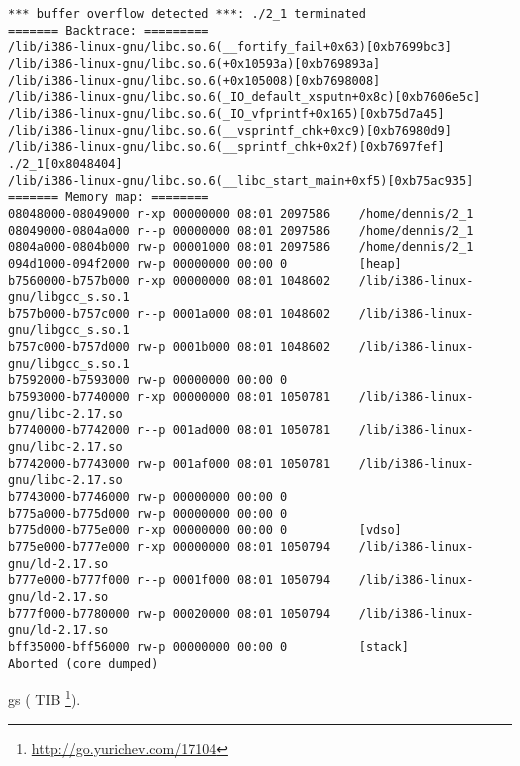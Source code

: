 \begin{lstlisting}
*** buffer overflow detected ***: ./2_1 terminated
======= Backtrace: =========
/lib/i386-linux-gnu/libc.so.6(__fortify_fail+0x63)[0xb7699bc3]
/lib/i386-linux-gnu/libc.so.6(+0x10593a)[0xb769893a]
/lib/i386-linux-gnu/libc.so.6(+0x105008)[0xb7698008]
/lib/i386-linux-gnu/libc.so.6(_IO_default_xsputn+0x8c)[0xb7606e5c]
/lib/i386-linux-gnu/libc.so.6(_IO_vfprintf+0x165)[0xb75d7a45]
/lib/i386-linux-gnu/libc.so.6(__vsprintf_chk+0xc9)[0xb76980d9]
/lib/i386-linux-gnu/libc.so.6(__sprintf_chk+0x2f)[0xb7697fef]
./2_1[0x8048404]
/lib/i386-linux-gnu/libc.so.6(__libc_start_main+0xf5)[0xb75ac935]
======= Memory map: ========
08048000-08049000 r-xp 00000000 08:01 2097586    /home/dennis/2_1
08049000-0804a000 r--p 00000000 08:01 2097586    /home/dennis/2_1
0804a000-0804b000 rw-p 00001000 08:01 2097586    /home/dennis/2_1
094d1000-094f2000 rw-p 00000000 00:00 0          [heap]
b7560000-b757b000 r-xp 00000000 08:01 1048602    /lib/i386-linux-gnu/libgcc_s.so.1
b757b000-b757c000 r--p 0001a000 08:01 1048602    /lib/i386-linux-gnu/libgcc_s.so.1
b757c000-b757d000 rw-p 0001b000 08:01 1048602    /lib/i386-linux-gnu/libgcc_s.so.1
b7592000-b7593000 rw-p 00000000 00:00 0
b7593000-b7740000 r-xp 00000000 08:01 1050781    /lib/i386-linux-gnu/libc-2.17.so
b7740000-b7742000 r--p 001ad000 08:01 1050781    /lib/i386-linux-gnu/libc-2.17.so
b7742000-b7743000 rw-p 001af000 08:01 1050781    /lib/i386-linux-gnu/libc-2.17.so
b7743000-b7746000 rw-p 00000000 00:00 0
b775a000-b775d000 rw-p 00000000 00:00 0
b775d000-b775e000 r-xp 00000000 00:00 0          [vdso]
b775e000-b777e000 r-xp 00000000 08:01 1050794    /lib/i386-linux-gnu/ld-2.17.so
b777e000-b777f000 r--p 0001f000 08:01 1050794    /lib/i386-linux-gnu/ld-2.17.so
b777f000-b7780000 rw-p 00020000 08:01 1050794    /lib/i386-linux-gnu/ld-2.17.so
bff35000-bff56000 rw-p 00000000 00:00 0          [stack]
Aborted (core dumped)
\end{lstlisting}

gs\EMDASH{}
(
\ac{TIB} \footnote{\url{http://go.yurichev.com/17104}}). 

